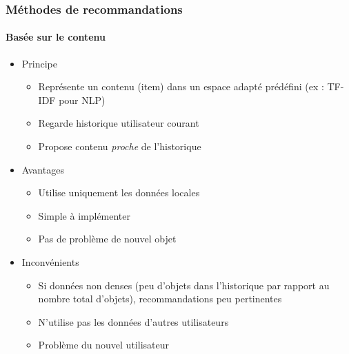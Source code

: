 \documentclass[11pt,sans]{beamer}
\begin{document}
    \begin{frame}
        \frametitle{M\'ethodes de recommandations}
        \framesubtitle{Bas\'ee sur le contenu}

        \begin{itemize}
            \item Principe
                \begin{itemize}
                    \item Repr\'esente un contenu (item) dans un espace adapt\'e
                        pr\'ed\'efini (ex : TF-IDF pour NLP)
                    \item Regarde historique utilisateur courant
                    \item Propose contenu \emph{proche} de l'historique
                \end{itemize}
            \item Avantages
                \begin{itemize}
                    \item Utilise uniquement les donn\'ees locales
                    \item Simple à impl\'ementer
                    \item Pas de problème de nouvel objet
                \end{itemize}
            \item Inconv\'enients
                \begin{itemize}
                    \item Si donn\'ees non denses (peu d'objets
                        dans l'historique par rapport au nombre total
                        d'objets), recommandations peu pertinentes
                    \item N'utilise pas les donn\'ees d'autres utilisateurs
                    \item Problème du nouvel utilisateur
                \end{itemize}
        \end{itemize}
    \end{frame}
\end{document}
